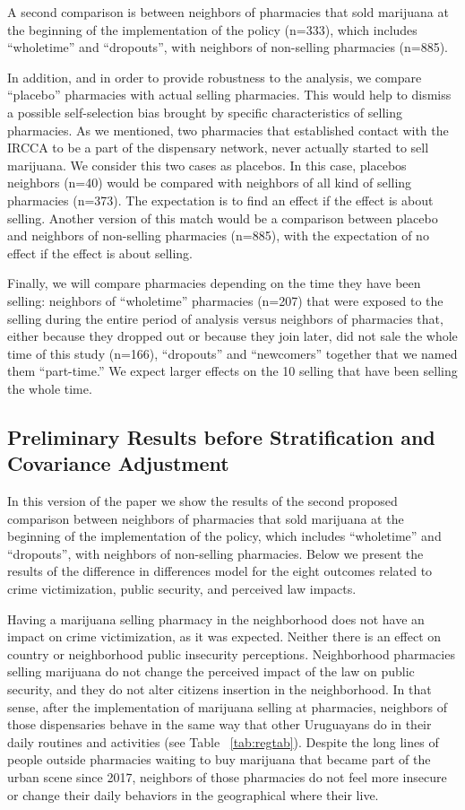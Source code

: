 \documentclass[11pt]{article}
\begin{document}
A second comparison is between neighbors of pharmacies that sold marijuana at the beginning of the implementation of the policy (n=333), which includes ``wholetime'' and ``dropouts'', with neighbors of non-selling pharmacies (n=885).

In addition, and in order to provide robustness to the analysis, we compare ``placebo'' pharmacies with actual selling pharmacies. This would help to dismiss a possible self-selection bias brought by specific characteristics of selling pharmacies. As we mentioned, two pharmacies that established contact with the IRCCA to be a part of the dispensary network, never actually started to sell marijuana. We consider this two cases as placebos. In this case, placebos neighbors (n=40) would be compared with neighbors of all kind of selling pharmacies (n=373). The expectation is to find an effect if the effect is about selling. Another version of this match would be a comparison between placebo and neighbors of non-selling pharmacies (n=885), with the expectation of no effect if the effect is about selling.

Finally, we will compare pharmacies depending on the time they have been selling: neighbors of ``wholetime'' pharmacies (n=207) that were exposed to the selling during the entire period of analysis versus neighbors of pharmacies that, either because they dropped out or because they join later, did not sale the whole time of this study (n=166), ``dropouts'' and ``newcomers'' together that we named them ``part-time.'' We expect larger effects on the 10 selling that have been selling the whole time.

\subsection{Preliminary Results before Stratification and Covariance Adjustment}
In this version of the paper we show the results of the second proposed comparison between neighbors of pharmacies that sold marijuana at the beginning of the implementation of the policy, which includes ``wholetime'' and ``dropouts'', with neighbors of non-selling pharmacies. Below we present the results of the difference in differences model for the eight outcomes related to crime victimization, public security, and perceived law impacts.

Having a marijuana selling pharmacy in the neighborhood does not have an impact on crime victimization, as it was expected. Neither there is an effect on country or neighborhood public insecurity perceptions. Neighborhood pharmacies selling marijuana do not change the perceived impact of the law on public security, and they do not alter citizens insertion in the neighborhood. In that sense, after the implementation of marijuana selling at pharmacies, neighbors of those dispensaries behave in the same way that other Uruguayans do in their daily routines and activities (see Table ~\ref{tab:regtab}). Despite the long lines of people outside pharmacies waiting to buy marijuana that became part of the urban scene since 2017, neighbors of those pharmacies do not feel more insecure or change their daily behaviors in the geographical where their live.
\end{document}
